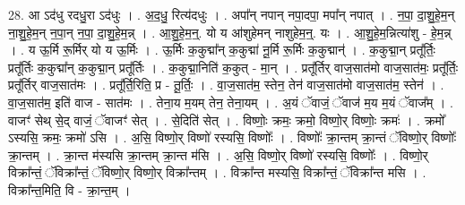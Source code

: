 \documentclass[17pt]{extarticle}
\begin{document}
28. आ ऽद॑धु रदधु॒रा ऽद॑धुः । . अ॒द॒धु॒ रित्य॑दधुः । . अपा᳚न् नपान् नपा॒दपा॒ मपा᳚न् नपात् । . न॒पा॒ दा॒शु॒हे॒म॒न् ना॒शु॒हे॒म॒न् न॒पा॒न् न॒पा॒ दा॒शु॒हे॒म॒न्न् । . आ॒शु॒हे॒म॒न्॒. यो य आ॑शुहेमन् नाशुहेम॒न्॒. यः । . आ॒शु॒हे॒म॒न्नित्या॑शु - हे॒म॒न्न् । . य ऊ॒र्मि रू॒र्मिर् यो य ऊ॒र्मिः । . ऊ॒र्मिः क॒कुद्मा᳚न् क॒कुद्मा॑ नू॒र्मि रू॒र्मिः क॒कुद्मान्॑ । . क॒कुद्मा॒न् प्रतू᳚र्तिः॒ प्रतू᳚र्तिः क॒कुद्मा᳚न् क॒कुद्मा॒न् प्रतू᳚र्तिः । . क॒कुद्मा॒निति॑ क॒कुत् - मा॒न् । . प्रतू᳚र्तिर् वाज॒सात॑मो वाज॒सात॑मः॒ प्रतू᳚र्तिः॒ प्रतू᳚र्तिर् वाज॒सात॑मः । . प्रतू᳚र्ति॒रिति॒ प्र - तू॒र्तिः॒ । . वा॒ज॒सात॑म॒ स्तेन॒ तेन॑ वाज॒सात॑मो वाज॒सात॑म॒ स्तेन॑ । . वा॒ज॒सात॑म॒ इति॑ वाज - सात॑मः । . तेना॒य म॒यम् तेन॒ तेना॒यम् । . अ॒यं ॅवाजं॒ ॅवाज॑ म॒य म॒यं ॅवाज᳚म् । . वाजꣳ॑ सेथ् से॒द् वाजं॒ ॅवाजꣳ॑ सेत् । . से॒दिति॑ सेत् । . विष्णोः॒ क्रमः॒ क्रमो॒ विष्णो॒र् विष्णोः॒ क्रमः॑ । . क्रमो᳚ ऽस्यसि॒ क्रमः॒ क्रमो॑ ऽसि । . अ॒सि॒ विष्णो॒र् विष्णो॑ रस्यसि॒ विष्णोः᳚ । . विष्णोः᳚ क्रा॒न्तम् क्रा॒न्तं ॅविष्णो॒र् विष्णोः᳚ क्रा॒न्तम् । . क्रा॒न्त म॑स्यसि क्रा॒न्तम् क्रा॒न्त म॑सि । . अ॒सि॒ विष्णो॒र् विष्णो॑ रस्यसि॒ विष्णोः᳚ । . विष्णो॒र् विक्रा᳚न्तं॒ ॅविक्रा᳚न्तं॒ ॅविष्णो॒र् विष्णो॒र् विक्रा᳚न्तम् । . विक्रा᳚न्त मस्यसि॒ विक्रा᳚न्तं॒ ॅविक्रा᳚न्त मसि । . विक्रा᳚न्त॒मिति॒ वि - क्रा॒न्त॒म् । \newline
\end{document}
